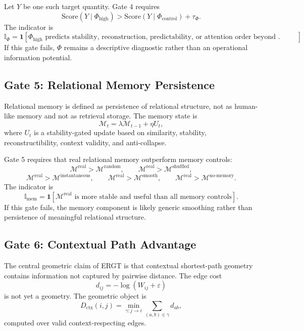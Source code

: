 \documentclass[11pt]{article}
\begin{document}
Let $Y$ be one such target quantity. Gate 4 requires
\[
\mathrm{Score}(Y\mid \Phi_{\mathrm{high}})
>
\mathrm{Score}(Y\mid \Phi_{\mathrm{control}})+\tau_{\Phi}.
\]
The indicator is
\[
\mathbb{I}_{\Phi}
=
\mathbf{1}
\left[
\Phi_{\mathrm{high}}
\text{ predicts stability, reconstruction, predictability, or attention order beyond controls}
\right].
\]
If this gate fails, $\Phi$ remains a descriptive diagnostic rather than an operational information potential.

\subsection{Gate 5: Relational Memory Persistence}

Relational memory is defined as persistence of relational structure, not as human-like memory and not as retrieval storage. The memory state is
\[
\mathcal{M}_t
=
\lambda\mathcal{M}_{t-1}
+
\eta U_t,
\]
where $U_t$ is a stability-gated update based on similarity, stability, reconstructibility, context validity, and anti-collapse.

Gate 5 requires that real relational memory outperform memory controls:
\[
\mathcal{M}^{\mathrm{real}}
>
\mathcal{M}^{\mathrm{random}},
\qquad
\mathcal{M}^{\mathrm{real}}
>
\mathcal{M}^{\mathrm{shuffled}},
\]
\[
\mathcal{M}^{\mathrm{real}}
>
\mathcal{M}^{\mathrm{instantaneous}},
\qquad
\mathcal{M}^{\mathrm{real}}
>
\mathcal{M}^{\mathrm{smooth}},
\qquad
\mathcal{M}^{\mathrm{real}}
>
\mathcal{M}^{\mathrm{no\text{-}memory}}.
\]
The indicator is
\[
\mathbb{I}_{\mathrm{mem}}
=
\mathbf{1}
\left[
\mathcal{M}^{\mathrm{real}}
\text{ is more stable and useful than all memory controls}
\right].
\]
If this gate fails, the memory component is likely generic smoothing rather than persistence of meaningful relational structure.

\subsection{Gate 6: Contextual Path Advantage}

The central geometric claim of ERGT is that contextual shortest-path geometry contains information not captured by pairwise distance. The edge cost
\[
d_{ij}=-\log(W_{ij}+\varepsilon)
\]
is not yet a geometry. The geometric object is
\[
D_{\mathrm{ctx}}(i,j)
=
\min_{\gamma:j\to i}
\sum_{(a,b)\in\gamma}d_{ab},
\]
computed over valid context-respecting edges.
\end{document}
